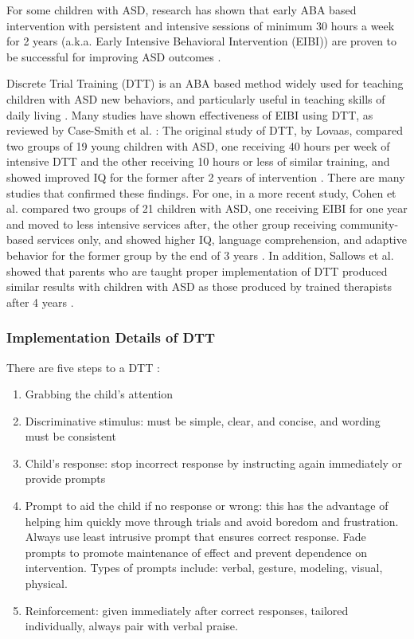 For some children with ASD, research has shown that early ABA based intervention with persistent and intensive sessions of minimum 30 hours a week for 2 years (a.k.a. Early Intensive Behavioral Intervention (EIBI)) are proven to be successful for improving ASD outcomes \cite{howlin2009systematic}.

Discrete Trial Training (DTT) is an ABA based method widely used for teaching children with ASD new behaviors, and particularly useful in teaching skills of daily living \cite{smith2001discrete}.  Many studies have shown effectiveness of EIBI using DTT, as reviewed by Case-Smith et al. \cite{case2008evidence}: The original study of DTT, by Lovaas, compared two groups of 19 young children with ASD, one receiving 40 hours per week of intensive DTT and the other receiving 10 hours or less of similar training, and showed improved IQ for the former after 2 years of intervention \cite{lovaas1987behavioral}.  There are many studies that confirmed these findings.  For one, in a more recent study, Cohen et al. compared two groups of 21 children with ASD, one receiving EIBI for one year and moved to less intensive services after, the other group receiving community-based services only, and showed higher IQ, language comprehension, and adaptive behavior for the former group by the end of 3 years \cite{cohen2006early}.  In addition, Sallows et al. showed that parents who are taught proper implementation of DTT produced similar results with children with ASD as those produced by trained therapists after 4 years \cite{sallows2005intensive}.

\subsubsection{Implementation Details of DTT}
There are five steps to a DTT \cite{bogin2010steps}:
\begin{enumerate}
	\item Grabbing the child's attention
	\item Discriminative stimulus: must be simple, clear, and concise, and wording must be consistent
	\item Child's response: stop incorrect response by instructing again immediately or provide prompts
	\item Prompt to aid the child if no response or wrong: this has the advantage of helping him quickly move through trials and avoid boredom and frustration.  Always use least intrusive prompt that ensures correct response.  Fade prompts to promote maintenance of effect and prevent dependence on intervention.  Types of prompts include: verbal, gesture, modeling, visual, physical.
	\item Reinforcement: given immediately after correct responses, tailored individually, always pair with verbal praise.
\end{enumerate}

